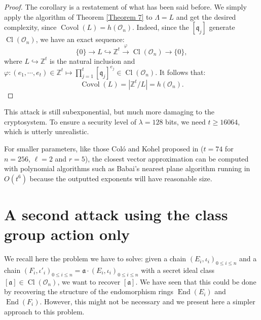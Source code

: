 \documentclass[a4paper,10pt]{report}
\theoremstyle{definition}
\theoremstyle{plain}
\theoremstyle{definition}
\newcommand{\Z}{\mathbb{Z}}
\newcommand{\mO}{\mathcal{O}}
\renewcommand{\(}{\left(}
\renewcommand{\)}{\right)}
\newcommand{\mf}[1]{\mathfrak{#1}}
\DeclareMathOperator{\End}{End}
\DeclareMathOperator{\Cl}{Cl}
\DeclareMathOperator{\Covol}{Covol}
\begin{document}
\begin{proof}
The corollary is a restatement of what has been said before. We simply apply the algorithm of Theorem \ref{Theorem 7} to $\Lambda=L$ and get the desired complexity, since $\Covol(L)=h(\mO_n)$.  Indeed, since the $[\mf{q}_j]$ generate $\Cl(\mO_n)$, we have an exact sequence:
\[\{0\}\longrightarrow L\hookrightarrow \Z^t\overset{\varphi}{\longrightarrow} \Cl(\mO_n)\longrightarrow\{0\},\]
where $ L\hookrightarrow \Z^t$ is the natural inclusion and $\varphi : (e_1,\cdots,e_t)\in\Z^t\longmapsto \prod_{j=1}^t[\mf{q}_j]^{e_j}\in \Cl(\mO_n)$. It follows that:
\[\Covol(L)=|\Z^t/L|=h(\mO_n).\]
\end{proof}

This attack is still subexponential, but much more damaging to the cryptosystem. To ensure a security level of $\lambda=128$ bits, we need $t\geq 16064$, which is utterly unrealistic. 

For smaller parameters, like those Col\'{o} and Kohel proposed in \cite[section 6]{OSIDH} ($t=74$ for $n=256$, $\ell=2$ and $r=5$), the closest vector approximation can be computed with polynomial algorithms such as Babai's nearest plane algorithm \cite{Babai} running in $O(t^6)$ because the outputted exponents will have reasonable size. 

\section{A second attack using the class group action only}

We recall here the problem we have to solve: given a chain $(E_i,\iota_i)_{0\leq i\leq n}$ and a chain $(F_i,\iota'_i)_{0\leq i\leq n}=\mf{a}\cdot(E_i,\iota_i)_{0\leq i\leq n}$ with a secret ideal class $[\mf{a}]\in\Cl(\mO_n)$, we want to recover $[\mf{a}]$. We have seen that this could be done by recovering the structure of the endomorphism rings $\End(E_i)$ and $\End(F_i)$. However, this might not be necessary and we present here a simpler approach to this problem. 
\end{document}
